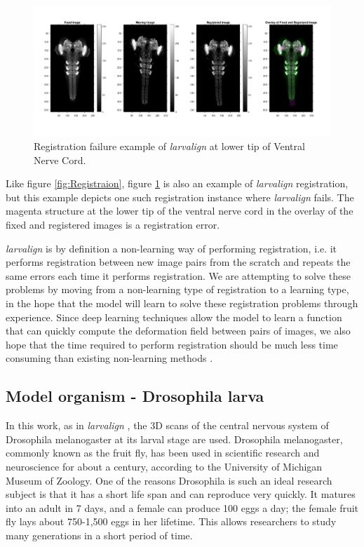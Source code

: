 \documentclass{article}
\begin{document}
	\begin{figure}[H]
		\centering
		\includegraphics[width=\linewidth]{resources/motivation_fig_1.jpg}
		\caption{Registration failure example of \emph{larvalign} at lower tip of Ventral Nerve Cord.}
		\label{fig:Registraion_Failure}
	\end{figure}
	
	 Like figure \ref{fig:Registraion}, figure \ref{fig:Registraion_Failure} is also an example of \emph{larvalign} registration, but this example depicts one such registration instance where \emph{larvalign} fails. The magenta structure at the lower tip of the ventral nerve cord in the overlay of the fixed and registered images is a registration error. \newline
	
	\emph{larvalign} is by definition a non-learning way of performing registration, i.e. it performs registration between new image pairs from the scratch and repeats the same errors each time it performs registration. We are attempting to solve these problems by moving from a non-learning type of registration to a learning type, in the hope that the model will learn to solve these registration problems through experience. Since deep learning techniques allow the model to learn a function that can quickly compute the deformation field between pairs of images, we also hope that the time required to perform registration should be much less time consuming than existing non-learning methods \cite{Voxelmorph} \cite{deVos_2018} \cite{Wu_2016} \cite{Yang_2017} \cite{Hessam_2017}.
	
	\subsection{Model organism - Drosophila larva}
	
	In this work, as in \emph{larvalign} \cite{Mu_2018}, the 3D scans of the central nervous system of Drosophila melanogaster at its larval stage are used. Drosophila melanogaster, commonly known as the fruit fly, has been used in scientific research and neuroscience for about a century, according to the University of Michigan Museum of Zoology. One of the reasons Drosophila is such an ideal research subject is that it has a short life span and can reproduce very quickly. It matures into an adult in 7 days, and a female can produce 100 eggs a day; the female fruit fly lays about 750-1,500 eggs in her lifetime. This allows researchers to study many generations in a short period of time. \newline
	
\end{document}
